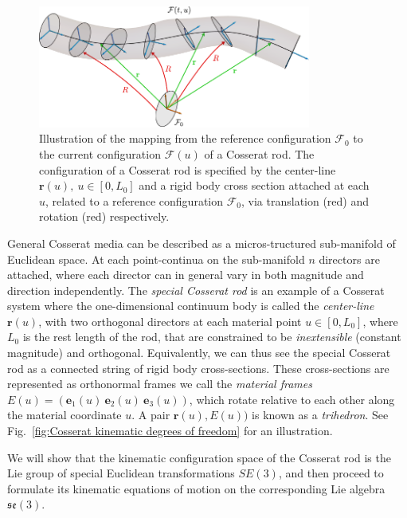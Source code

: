 \begin{figure}[t]
\centering
        \includegraphics[width=0.8\textwidth]{figs_part2/sec7.2.1_cosserat_rod_kinematics/cosserat_F0_to_F.pdf}
        \caption{Illustration of the mapping from the reference configuration $\mathcal{F}_0$ to the current configuration $\mathcal{F}(u)$ of a Cosserat rod. The configuration of a Cosserat rod is specified by the center-line $\mathbf{r}(u),\ u \in [0, L_0]$ and a rigid body cross section attached at each $u$, related to a reference configuration $\mathcal{F}_0$, via translation (red) and rotation (red) respectively.}
        \label{fig:cosserat F0 to F}
\end{figure}

General Cosserat media can be described as a micros-tructured sub-manifold of Euclidean space. At each point-continua on the sub-manifold $n$ directors are attached, where each director can in general vary in both magnitude and direction independently. The \textit{special Cosserat rod} is an example of a Cosserat system where the one-dimensional continuum body is called the \textit{center-line} $\mathbf{r}(u)$, with two orthogonal directors at each material point $u \in [0, L_0]$, where $L_0$ is the rest length of the rod, that are constrained to be \textit{inextensible} (constant magnitude) and orthogonal. Equivalently, we can thus see the special Cosserat rod as a connected string of rigid body cross-sections. These cross-sections are represented as orthonormal frames we call the \textit{material frames} $E(u) = (\mathbf{e}_1(u)\ \mathbf{e}_2(u)\ \mathbf{e}_3(u))$, which rotate relative to each other along the material coordinate $u$. A pair $\mathbf{r}(u), E(u))$ is known as a \textit{trihedron}. See Fig.~\ref{fig:Cosserat kinematic degrees of freedom} for an illustration.

We will show that the kinematic configuration space of the Cosserat rod is the Lie group of special Euclidean transformations $SE(3)$, and then proceed to formulate its kinematic equations of motion on the corresponding Lie algebra $\mathfrak{se}(3)$.

